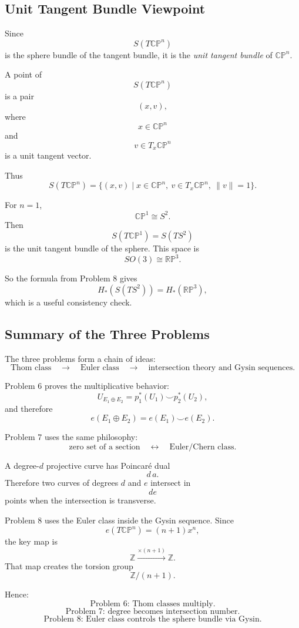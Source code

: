\documentclass[12pt,a4paper]{article}
\theoremstyle{notespace}
\begin{document}
\subsection{Unit Tangent Bundle Viewpoint}

Since
\[
S(T\mathbb{CP}^n)
\]
is the sphere bundle of the tangent bundle, it is the \emph{unit tangent bundle}
of \(\mathbb{CP}^n\).

A point of
\[
S(T\mathbb{CP}^n)
\]
is a pair
\[
(x,v),
\]
where
\[
x\in \mathbb{CP}^n
\]
and
\[
v\in T_x\mathbb{CP}^n
\]
is a unit tangent vector.

Thus
\[
S(T\mathbb{CP}^n)
=
\{(x,v)\mid x\in \mathbb{CP}^n,\ v\in T_x\mathbb{CP}^n,\ \|v\|=1\}.
\]

For \(n=1\),
\[
\mathbb{CP}^1\cong S^2.
\]
Then
\[
S(T\mathbb{CP}^1)=S(TS^2)
\]
is the unit tangent bundle of the sphere. This space is
\[
SO(3)\cong \mathbb{RP}^3.
\]

So the formula from Problem 8 gives
\[
H_*(S(TS^2))=H_*(\mathbb{RP}^3),
\]
which is a useful consistency check.

\subsection{Summary of the Three Problems}

The three problems form a chain of ideas:
\[
\text{Thom class}
\quad\longrightarrow\quad
\text{Euler class}
\quad\longrightarrow\quad
\text{intersection theory and Gysin sequences}.
\]

Problem 6 proves the multiplicative behavior:
\[
U_{E_1\oplus E_2}
=
p_1^*(U_1)\smile p_2^*(U_2),
\]
and therefore
\[
e(E_1\oplus E_2)
=
e(E_1)\smile e(E_2).
\]

Problem 7 uses the same philosophy:
\[
\text{zero set of a section}
\quad\longleftrightarrow\quad
\text{Euler/Chern class}.
\]

A degree-\(d\) projective curve has Poincar\'e dual
\[
d\,a.
\]
Therefore two curves of degrees \(d\) and \(e\) intersect in
\[
de
\]
points when the intersection is transverse.

Problem 8 uses the Euler class inside the Gysin sequence. Since
\[
e(T\mathbb{CP}^n)=(n+1)x^n,
\]
the key map is
\[
\mathbb Z\xrightarrow{\times(n+1)}\mathbb Z.
\]
That map creates the torsion group
\[
\mathbb Z/(n+1).
\]

Hence:
\[
\boxed{
	\text{Problem 6: Thom classes multiply.}
}
\]
\[
\boxed{
	\text{Problem 7: degree becomes intersection number.}
}
\]
\[
\boxed{
	\text{Problem 8: Euler class controls the sphere bundle via Gysin.}
}
\]
	
\end{document}
